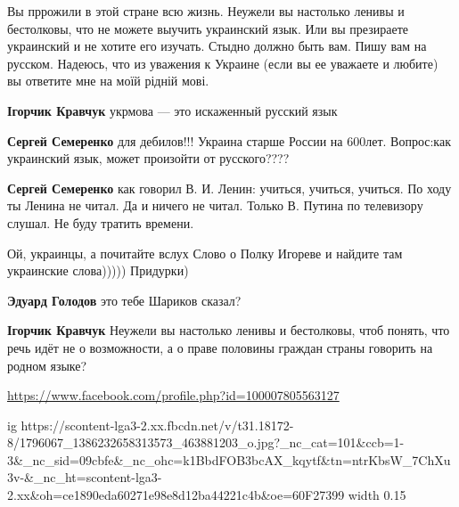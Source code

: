 Вы пррожили в этой стране всю жизнь. Неужели вы настолько ленивы и бестолковы,
что не можете выучить украинский язык. Или вы презираете украинский и не хотите
его изучать. Стыдно должно быть вам. Пишу вам на русском. Надеюсь, что из
уважения к Украине (если вы ее уважаете и любите) вы ответите мне на моїй
рідній мові.

\begin{itemize}

\textbf{Ігорчик Кравчук} укрмова --- это искаженный русский язык


\textbf{Сергей Семеренко} для дебилов!!! Украина старше России на 600лет. Вопрос:как украинский язык, может произойти от русского????


\textbf{Сергей Семеренко} как говорил В. И. Ленин: учиться, учиться, учиться.
По ходу ты Ленина не читал. Да и ничего не читал. Только В. Путина по телевизору слушал. Не буду тратить времени.👋


Ой, украинцы, а почитайте вслух Слово о Полку Игореве и найдите там украинские слова))))) Придурки)


\textbf{Эдуард Голодов} это тебе Шариков сказал?


\textbf{Ігорчик Кравчук} Неужели вы настолько ленивы и бестолковы, чтоб понять,
что речь идёт не о возможности, а о праве половины граждан страны говорить на
родном языке?
\end{itemize}

\url{https://www.facebook.com/profile.php?id=100007805563127}\par
\ifcmt
  ig https://scontent-lga3-2.xx.fbcdn.net/v/t31.18172-8/1796067_1386232658313573_463881203_o.jpg?_nc_cat=101&ccb=1-3&_nc_sid=09cbfe&_nc_ohc=k1BbdFOB3bcAX_kqytf&tn=ntrKbsW_7ChXu3v-&_nc_ht=scontent-lga3-2.xx&oh=ce1890eda60271e98e8d12ba44221c4b&oe=60F27399
  width 0.15
\fi


